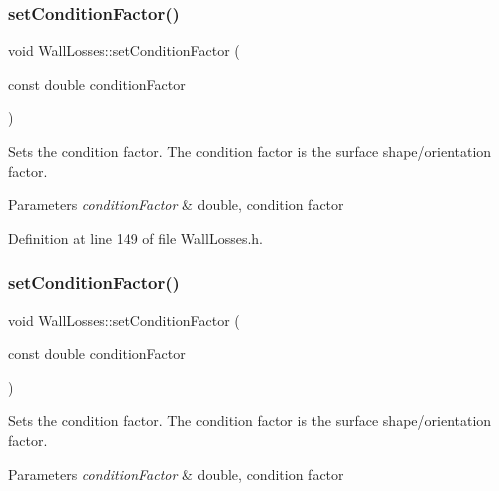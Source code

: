 \mbox{\label{class_wall_losses_a1533a7513460d22f433fb670700573a2}} 
\subsubsection{\texorpdfstring{set\+Condition\+Factor()}{setConditionFactor()}\hspace{0.1cm}{\footnotesize\ttfamily [2/3]}}
{\footnotesize\ttfamily void Wall\+Losses\+::set\+Condition\+Factor (\begin{DoxyParamCaption}\item[{const double}]{condition\+Factor }\end{DoxyParamCaption})\hspace{0.3cm}{\ttfamily [inline]}}

Sets the condition factor. The condition factor is the surface shape/orientation factor. 
\begin{DoxyParams}{Parameters}
{\em condition\+Factor} & double, condition factor \\
\hline
\end{DoxyParams}


Definition at line 149 of file Wall\+Losses.\+h.

\mbox{\label{class_wall_losses_a1533a7513460d22f433fb670700573a2}} 
\subsubsection{\texorpdfstring{set\+Condition\+Factor()}{setConditionFactor()}\hspace{0.1cm}{\footnotesize\ttfamily [3/3]}}
{\footnotesize\ttfamily void Wall\+Losses\+::set\+Condition\+Factor (\begin{DoxyParamCaption}\item[{const double}]{condition\+Factor }\end{DoxyParamCaption})\hspace{0.3cm}{\ttfamily [inline]}}

Sets the condition factor. The condition factor is the surface shape/orientation factor. 
\begin{DoxyParams}{Parameters}
{\em condition\+Factor} & double, condition factor \\
\hline
\end{DoxyParams}



